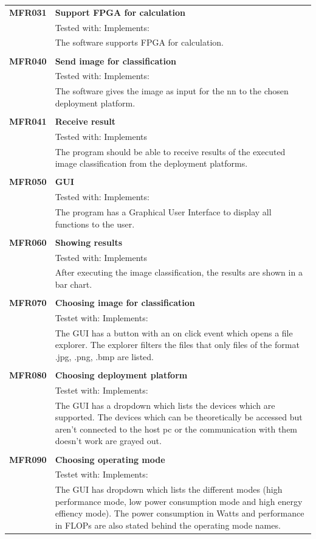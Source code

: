 \documentclass[parskip=full]{scrartcl}
\begin{document}
\newpage
\begin{tabular}{p{2cm}p{12cm}}
\textbf {MFR031} & \textbf{Support FPGA for calculation} \\
& Tested with: Implements: \\
& The software supports FPGA for calculation. \\
& \\
\textbf {MFR040} & \textbf{Send image for classification} \\
& Tested with: Implements: \\
& The software gives the image as input for the {nn} to the chosen deployment platform. \\
& \\
\textbf {MFR041} & \textbf{Receive result} \\
& Tested with: Implements \\
& The program should be able to receive results of the executed image classification from the deployment platforms. \\
& \\
\textbf {MFR050} & \textbf{GUI} \\
& Tested with: Implements: \\
& The program has a Graphical User Interface to display all functions to the user. \\
& \\
\textbf {MFR060} & \textbf{Showing results} \\
& Tested with: Implements\\
& After executing the image classification, the results are shown in a bar chart. \\
& \\
\textbf{MFR070} & \textbf{Choosing image for classification}\\
& Testet with: Implements: \\
& The GUI has a button with an on click event which opens a file explorer. The explorer filters the files that only files of the format .jpg, .png, .bmp are listed.\\
& \\
\textbf{MFR080} & \textbf{Choosing deployment platform}\\
& Testet with: Implements: \\
& The GUI has a dropdown which lists the devices which are supported. The devices which can be theoretically be accessed but aren't connected to the host pc or the communication with them doesn't work are grayed out. \\
& \\
\textbf{MFR090} & \textbf{Choosing operating mode}\\
& Testet with: Implements: \\
& The GUI has dropdown which lists the different modes (high performance mode, low power consumption mode and high energy effiency mode). The power consumption in Watts and performance in FLOPs are also stated behind the operating mode names.
\end{tabular}
\end{document}
